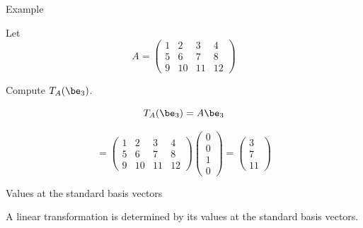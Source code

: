 \documentclass{beamer}
\begin{document}
\begin{frame}{Example}

Let
$$ A =
\begin{pmatrix}
1 & 2 & 3 & 4 \\
5 & 6 & 7 & 8 \\
9 & 10 & 11 & 12
\end{pmatrix}
$$

\pause

Compute $T_A(\be_3)$.

\pause

$$T_A(\be_3) = A \be_3$$


\pause

$$
=
\begin{pmatrix}
1 & 2  & 3  & 4 \\
5 & 6  & 7  & 8 \\
9 & 10 & 11 & 12
\end{pmatrix}
\begin{pmatrix}
0 \\ 0 \\ 1 \\ 0
\end{pmatrix}
=
\begin{pmatrix}
3 \\ 7 \\ 11
\end{pmatrix}
$$
\end{frame}


\beamerdefaultoverlayspecification{}

\begin{frame}{Values at the standard basis vectors}

A linear transformation is determined by its values at the standard basis vectors.


\end{frame}

\end{document}
